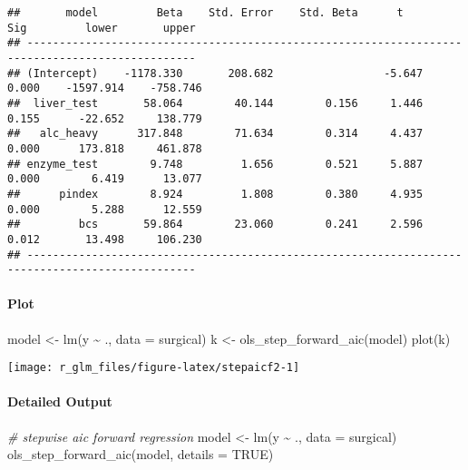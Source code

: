 \documentclass[
]{article}
\newenvironment{Shaded}{\begin{snugshade}}{\end{snugshade}}
\newcommand{\AttributeTok}[1]{\textcolor[rgb]{0.77,0.63,0.00}{#1}}
\newcommand{\CommentTok}[1]{\textcolor[rgb]{0.56,0.35,0.01}{\textit{#1}}}
\newcommand{\ConstantTok}[1]{\textcolor[rgb]{0.00,0.00,0.00}{#1}}
\newcommand{\FunctionTok}[1]{\textcolor[rgb]{0.00,0.00,0.00}{#1}}
\newcommand{\NormalTok}[1]{#1}
\newcommand{\OtherTok}[1]{\textcolor[rgb]{0.56,0.35,0.01}{#1}}
\newcommand{\SpecialCharTok}[1]{\textcolor[rgb]{0.00,0.00,0.00}{#1}}
\begin{document}
\begin{verbatim}
##       model         Beta    Std. Error    Std. Beta      t        Sig         lower       upper 
## ------------------------------------------------------------------------------------------------
## (Intercept)    -1178.330       208.682                 -5.647    0.000    -1597.914    -758.746 
##  liver_test       58.064        40.144        0.156     1.446    0.155      -22.652     138.779 
##   alc_heavy      317.848        71.634        0.314     4.437    0.000      173.818     461.878 
## enzyme_test        9.748         1.656        0.521     5.887    0.000        6.419      13.077 
##      pindex        8.924         1.808        0.380     4.935    0.000        5.288      12.559 
##         bcs       59.864        23.060        0.241     2.596    0.012       13.498     106.230 
## ------------------------------------------------------------------------------------------------
\end{verbatim}

\hypertarget{plot-5}{%
\paragraph{Plot}\label{plot-5}}

\begin{Shaded}
\begin{Highlighting}[]
\NormalTok{model }\OtherTok{\textless{}{-}} \FunctionTok{lm}\NormalTok{(y }\SpecialCharTok{\textasciitilde{}}\NormalTok{ ., }\AttributeTok{data =}\NormalTok{ surgical)}
\NormalTok{k }\OtherTok{\textless{}{-}} \FunctionTok{ols\_step\_forward\_aic}\NormalTok{(model)}
\FunctionTok{plot}\NormalTok{(k)}
\end{Highlighting}
\end{Shaded}

\begin{center}\texttt{[image: r\_glm\_files/figure-latex/stepaicf2-1]} \end{center}

\hypertarget{detailed-output-3}{%
\paragraph{Detailed Output}\label{detailed-output-3}}

\begin{Shaded}
\begin{Highlighting}[]
\CommentTok{\# stepwise aic forward regression}
\NormalTok{model }\OtherTok{\textless{}{-}} \FunctionTok{lm}\NormalTok{(y }\SpecialCharTok{\textasciitilde{}}\NormalTok{ ., }\AttributeTok{data =}\NormalTok{ surgical)}
\FunctionTok{ols\_step\_forward\_aic}\NormalTok{(model, }\AttributeTok{details =} \ConstantTok{TRUE}\NormalTok{)}
\end{Highlighting}
\end{Shaded}
\end{document}
